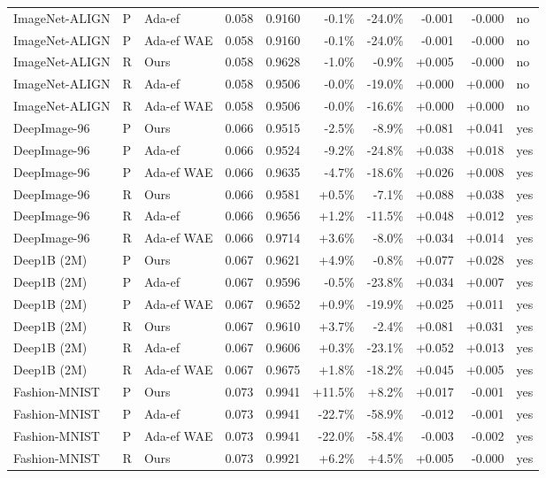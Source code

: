 \begin{tabular}{lllrrrrrrl}
ImageNet-ALIGN & P & Ada-ef & 0.058 & 0.9160 & -0.1\% & -24.0\% & -0.001 & -0.000 & no \\
ImageNet-ALIGN & P & Ada-ef WAE & 0.058 & 0.9160 & -0.1\% & -24.0\% & -0.001 & -0.000 & no \\
ImageNet-ALIGN & R & Ours & 0.058 & 0.9628 & -1.0\% & -0.9\% & +0.005 & -0.000 & no \\
ImageNet-ALIGN & R & Ada-ef & 0.058 & 0.9506 & -0.0\% & -19.0\% & +0.000 & +0.000 & no \\
ImageNet-ALIGN & R & Ada-ef WAE & 0.058 & 0.9506 & -0.0\% & -16.6\% & +0.000 & +0.000 & no \\
DeepImage-96 & P & Ours & 0.066 & 0.9515 & -2.5\% & -8.9\% & +0.081 & +0.041 & yes \\
DeepImage-96 & P & Ada-ef & 0.066 & 0.9524 & -9.2\% & -24.8\% & +0.038 & +0.018 & yes \\
DeepImage-96 & P & Ada-ef WAE & 0.066 & 0.9635 & -4.7\% & -18.6\% & +0.026 & +0.008 & yes \\
DeepImage-96 & R & Ours & 0.066 & 0.9581 & +0.5\% & -7.1\% & +0.088 & +0.038 & yes \\
DeepImage-96 & R & Ada-ef & 0.066 & 0.9656 & +1.2\% & -11.5\% & +0.048 & +0.012 & yes \\
DeepImage-96 & R & Ada-ef WAE & 0.066 & 0.9714 & +3.6\% & -8.0\% & +0.034 & +0.014 & yes \\
Deep1B (2M) & P & Ours & 0.067 & 0.9621 & +4.9\% & -0.8\% & +0.077 & +0.028 & yes \\
Deep1B (2M) & P & Ada-ef & 0.067 & 0.9596 & -0.5\% & -23.8\% & +0.034 & +0.007 & yes \\
Deep1B (2M) & P & Ada-ef WAE & 0.067 & 0.9652 & +0.9\% & -19.9\% & +0.025 & +0.011 & yes \\
Deep1B (2M) & R & Ours & 0.067 & 0.9610 & +3.7\% & -2.4\% & +0.081 & +0.031 & yes \\
Deep1B (2M) & R & Ada-ef & 0.067 & 0.9606 & +0.3\% & -23.1\% & +0.052 & +0.013 & yes \\
Deep1B (2M) & R & Ada-ef WAE & 0.067 & 0.9675 & +1.8\% & -18.2\% & +0.045 & +0.005 & yes \\
Fashion-MNIST & P & Ours & 0.073 & 0.9941 & +11.5\% & +8.2\% & +0.017 & -0.001 & yes \\
Fashion-MNIST & P & Ada-ef & 0.073 & 0.9941 & -22.7\% & -58.9\% & -0.012 & -0.001 & yes \\
Fashion-MNIST & P & Ada-ef WAE & 0.073 & 0.9941 & -22.0\% & -58.4\% & -0.003 & -0.002 & yes \\
Fashion-MNIST & R & Ours & 0.073 & 0.9921 & +6.2\% & +4.5\% & +0.005 & -0.000 & yes \\

\end{tabular}
